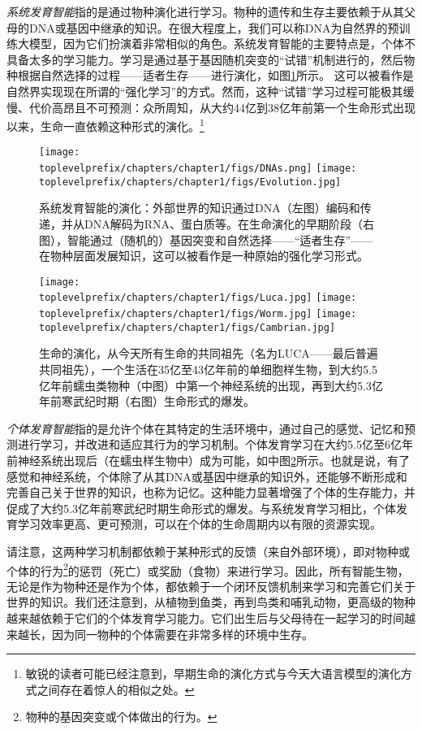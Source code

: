 \documentclass[../../book-main.tex]{subfiles}
\begin{document}
{\em 系统发育智能}指的是通过物种演化进行学习。物种的遗传和生存主要依赖于从其父母的DNA或基因中继承的知识。在很大程度上，我们可以称DNA为自然界的预训练大模型，因为它们扮演着非常相似的角色。系统发育智能的主要特点是，个体不具备太多的学习能力。学习是通过基于基因随机突变的“试错”机制进行的，然后物种根据自然选择的过程——适者生存——进行演化，如图\ref{fig:phylogenetic}所示。
这可以被看作是自然界实现现在所谓的“强化学习”的方式。然而，这种“试错”学习过程可能极其缓慢、代价高昂且不可预测：众所周知，从大约44亿到38亿年前第一个生命形式出现以来，生命一直依赖这种形式的演化。\footnote{敏锐的读者可能已经注意到，早期生命的演化方式与今天大语言模型的演化方式之间存在着惊人的相似之处。} 
\begin{figure}
    \centering
\texttt{[image: \\toplevelprefix/chapters/chapter1/figs/DNAs.png]}
\texttt{[image: \\toplevelprefix/chapters/chapter1/figs/Evolution.jpg]}
    \caption{系统发育智能的演化：外部世界的知识通过DNA（左图）编码和传递，并从DNA解码为RNA、蛋白质等。在生命演化的早期阶段（右图），智能通过（随机的）基因突变和自然选择——“适者生存”——在物种层面发展知识，这可以被看作是一种原始的强化学习形式。}
    \label{fig:phylogenetic}
\end{figure}
\begin{figure}
    \centering
\texttt{[image: \\toplevelprefix/chapters/chapter1/figs/Luca.jpg]}
\texttt{[image: \\toplevelprefix/chapters/chapter1/figs/Worm.jpg]}
\texttt{[image: \\toplevelprefix/chapters/chapter1/figs/Cambrian.jpg]}
    \caption{生命的演化，从今天所有生命的共同祖先（名为LUCA——最后普遍共同祖先），一个生活在35亿至43亿年前的单细胞样生物，到大约5.5亿年前蠕虫类物种（中图）中第一个神经系统的出现，再到大约5.3亿年前寒武纪时期（右图）生命形式的爆发。}
    \label{fig:evolution}
\end{figure}

{\em 个体发育智能}指的是允许个体在其特定的生活环境中，通过自己的感觉、记忆和预测进行学习，并改进和适应其行为的学习机制。个体发育学习在大约5.5亿至6亿年前神经系统出现后（在蠕虫样生物中）成为可能，如中图\ref{fig:evolution}所示。也就是说，有了感觉和神经系统，个体除了从其DNA或基因中继承的知识外，还能够不断形成和完善自己关于世界的知识，也称为记忆。这种能力显著增强了个体的生存能力，并促成了大约5.3亿年前寒武纪时期生命形式的爆发。与系统发育学习相比，个体发育学习效率更高、更可预测，可以在个体的生命周期内以有限的资源实现。

请注意，这两种学习机制都依赖于某种形式的反馈（来自外部环境），即对物种或个体的行为\footnote{物种的基因突变或个体做出的行为。}的惩罚（死亡）或奖励（食物）来进行学习。因此，所有智能生物，无论是作为物种还是作为个体，都依赖于一个闭环反馈机制来学习和完善它们关于世界的知识。我们还注意到，从植物到鱼类，再到鸟类和哺乳动物，更高级的物种越来越依赖于它们的个体发育学习能力。它们出生后与父母待在一起学习的时间越来越长，因为同一物种的个体需要在非常多样的环境中生存。
\end{document}

